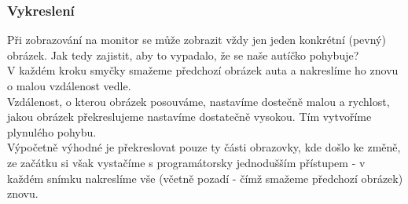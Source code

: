 \subsubsection{Vykreslení}
Při zobrazování na monitor se může zobrazit vždy jen jeden konkrétní (pevný) obrázek. Jak tedy zajistit, aby to vypadalo, že se naše autíčko pohybuje?\\
V každém kroku smyčky smažeme předchozí obrázek auta a nakreslíme ho znovu o malou vzdálenost vedle.\\
Vzdálenost, o kterou obrázek posouváme, nastavíme dostečně malou a rychlost, jakou obrázek překreslujeme nastavíme dostatečně vysokou. Tím vytvoříme  plynulého pohybu.\\Výpočetně výhodné je překreslovat pouze ty části obrazovky, kde došlo ke změně, ze začátku si však vystačíme s programátorsky jednodušším přístupem - v každém snímku nakreslíme vše (včetně pozadí - čímž smažeme předchozí obrázek) znovu. 

